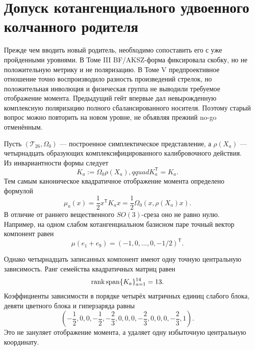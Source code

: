 \chapter{Допуск котангенциального удвоенного колчанного родителя}
\label{ch:v8-horizontal-phase-cotangent-doubled-quiver-parent-admission-gate}

Прежде чем вводить новый родитель, необходимо сопоставить его с уже
пройденными уровнями. В Томе III BF/AKSZ-форма фиксировала скобку, но не
положительную метрику и не поляризацию. В Томе V предпроективное отношение
точно воспроизводило разность произведений стрелок, но положительная
инволюция и физическая группа не выводили требуемое отображение момента.
Предыдущий гейт впервые дал невырожденную комплексную поляризацию полного
сбалансированного носителя. Поэтому старый вопрос можно повторить на новом
уровне, не объявляя прежний no-go отменённым.

Пусть $(\mathcal T_{26},\Omega_0)$ --- построенное симплектическое
представление, а $\rho(X_a)$ --- четырнадцать образующих
комплексифицированного калибровочного действия. Из инвариантности формы
следует
\begin{equation}
 K_a:=\Omega_0\rho(X_a),qquad K_a^{\mathsf T}=K_a.
 \label{eq:v8-cotangent-moment-quadratic-matrices}
\end{equation}
Тем самым каноническое квадратичное отображение момента определено формулой
\begin{equation}
 \mu_a(x)=\frac12x^{\mathsf T}K_ax
 =\frac12\Omega_0\!\left(x,\rho(X_a)x\right).
 \label{eq:v8-cotangent-moment-map}
\end{equation}
В отличие от раннего вещественного $SO(3)$-среза оно не равно нулю.
Например, на одном слабом котангенциальном базисном паре точный вектор
компонент равен
\begin{equation}
 \mu(e_1+e_9)=(-1,0,\ldots,0,-1/2)^{\mathsf T}.
 \label{eq:v8-cotangent-nonzero-moment-witness}
\end{equation}

Однако четырнадцать записанных компонент имеют одну точную центральную
зависимость. Ранг семейства квадратичных матриц равен
\begin{equation}
 \operatorname{rank}\operatorname{span}\{K_a\}_{a=1}^{14}=13.
 \label{eq:v8-cotangent-moment-span-rank}
\end{equation}
Коэффициенты зависимости в порядке четырёх матричных единиц слабого блока,
девяти цветного блока и гиперзаряда равны
\begin{equation}
 \left(-\frac12,0,0,-\frac12,
 -\frac23,0,0,0,-\frac23,0,0,0,-\frac23,1\right).
 \label{eq:v8-cotangent-central-generator-relation}
\end{equation}
Это не зануляет отображение момента, а удаляет одну избыточную центральную
координату.

